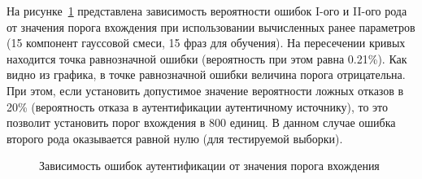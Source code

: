 На рисунке~\ref{fig:overall} представлена зависимость вероятности ошибок I-ого и II-ого рода от значения порога вхождения при использовании вычисленных ранее параметров (15 компонент гауссовой смеси, 15 фраз для обучения). На пересечении кривых находится точка равнозначной ошибки (вероятность при этом равна 0.21\%). Как видно из графика, в точке равнозначной ошибки величина порога отрицательна. При этом, если установить допустимое значение вероятности ложных отказов в 20\% (вероятность отказа в аутентификации аутентичному источнику), то это позволит установить порог вхождения в 800 единиц. В данном случае ошибка второго рода оказывается равной нулю (для тестируемой выборки).

\begin{figure}[ht!]
\caption{Зависимость ошибок аутентификации от значения порога вхождения}
\label{fig:overall}
\end{figure}


